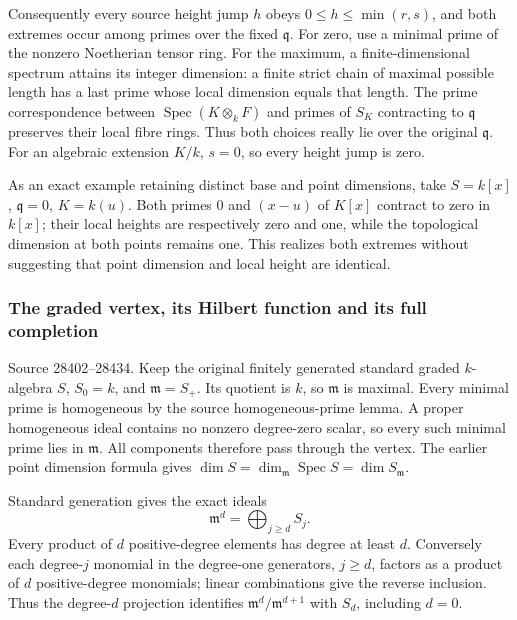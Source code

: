 Consequently every source height jump \(h\) obeys \(0\leq h\leq\min(r,s)\), and both extremes occur among primes over the fixed \(\mathfrak q\). For zero, use a minimal prime of the nonzero Noetherian tensor ring. For the maximum, a finite-dimensional spectrum attains its integer dimension: a finite strict chain of maximal possible length has a last prime whose local dimension equals that length. The prime correspondence between \(\operatorname{Spec}(K\otimes_kF)\) and primes of \(S_K\) contracting to \(\mathfrak q\) preserves their local fibre rings. Thus both choices really lie over the original \(\mathfrak q\). For an algebraic extension \(K/k\), \(s=0\), so every height jump is zero.

As an exact example retaining distinct base and point dimensions, take \(S=k[x]\), \(\mathfrak q=0\), \(K=k(u)\). Both primes \(0\) and \((x-u)\) of \(K[x]\) contract to zero in \(k[x]\); their local heights are respectively zero and one, while the topological dimension at both points remains one. This realizes both extremes without suggesting that point dimension and local height are identical.

\subsubsection{The graded vertex, its Hilbert function and its full completion}\label{algebra-proof-026-the-graded-vertex-its-hilbert-function-and-its-full-completion}

Source 28402--28434. Keep the original finitely generated standard graded \(k\)-algebra \(S\), \(S_0=k\), and \(\mathfrak m=S_+\). Its quotient is \(k\), so \(\mathfrak m\) is maximal. Every minimal prime is homogeneous by the source homogeneous-prime lemma. A proper homogeneous ideal contains no nonzero degree-zero scalar, so every such minimal prime lies in \(\mathfrak m\). All components therefore pass through the vertex. The earlier point dimension formula gives \(\dim S=\dim_{\mathfrak m}\operatorname{Spec}S=\dim S_{\mathfrak m}\).

Standard generation gives the exact ideals \[
 \mathfrak m^d=\bigoplus_{j\geq d}S_j.
\] Every product of \(d\) positive-degree elements has degree at least \(d\). Conversely each degree-\(j\) monomial in the degree-one generators, \(j\geq d\), factors as a product of \(d\) positive-degree monomials; linear combinations give the reverse inclusion. Thus the degree-\(d\) projection identifies \(\mathfrak m^d/\mathfrak m^{d+1}\) with \(S_d\), including \(d=0\).

